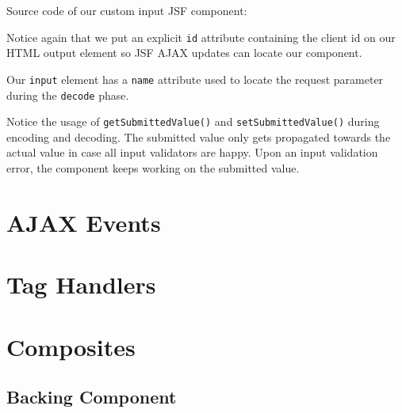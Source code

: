 Source code of our custom input JSF component:


Notice again that we put an explicit \texttt{id} attribute containing the client id on our HTML output element so JSF AJAX updates can locate our component.

Our \texttt{input} element has a \texttt{name} attribute used to locate the request parameter during the \texttt{decode} phase.

Notice the usage of \texttt{getSubmittedValue()} and \texttt{setSubmittedValue()} during encoding and decoding.
The submitted value only gets propagated towards the actual value in case all input validators are happy.
Upon an input validation error, the component keeps working on the submitted value.

\section{AJAX Events}

\section{Tag Handlers}

\section{Composites}

\subsection{Backing Component}